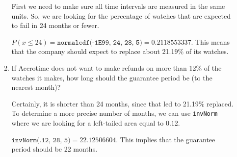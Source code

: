 \documentclass{article}
\newcommand{\answer}[1]{\color{red}#1}
\begin{document}
\begin{enumerate}
\begin{enumerate}
	{\answer First we need to make sure all time intervals are measured in the same units.  So, we are looking for the percentage of watches that are expected to fail in 24 months or fewer. 
	
	$P(x\leq 24) = \texttt{normalcdf(-1E99, 24, 28, 5)} = 0.2118553337$.  This means that the company should expect to replace about 21.19\% of its watches.
	} 

	\item If Accrotime does not want to make refunds on more than 12\% of the watches it makes, how long should the guarantee period be (to the nearest month)? 
	
	{\answer Certainly, it is shorter than 24 months, since that led to 21.19\% replaced.  To determine a more precise number of months, we can use \texttt{invNorm} where we are looking for a left-tailed area equal to $0.12$. 
	
	$\texttt{invNorm(.12, 28, 5)} = 22.12506604$.  This implies that the guarantee period should be 22 months.
	} 

	\end{enumerate}

\end{enumerate}
\end{document}
